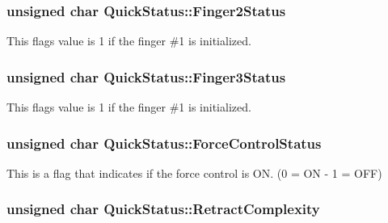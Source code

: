 \subsubsection[{\texorpdfstring{Finger2\+Status}{Finger2Status}}]{\setlength{\rightskip}{0pt plus 5cm}unsigned char Quick\+Status\+::\+Finger2\+Status}\hypertarget{struct_quick_status_a00d03a339f99ef4565b55f157b7d0ebc}{}\label{struct_quick_status_a00d03a339f99ef4565b55f157b7d0ebc}


This flag\textquotesingle{}s value is 1 if the finger \#1 is initialized. 

\subsubsection[{\texorpdfstring{Finger3\+Status}{Finger3Status}}]{\setlength{\rightskip}{0pt plus 5cm}unsigned char Quick\+Status\+::\+Finger3\+Status}\hypertarget{struct_quick_status_adb0674bfd3b4131c3e2ae0862d5bee50}{}\label{struct_quick_status_adb0674bfd3b4131c3e2ae0862d5bee50}


This flag\textquotesingle{}s value is 1 if the finger \#1 is initialized. 

\subsubsection[{\texorpdfstring{Force\+Control\+Status}{ForceControlStatus}}]{\setlength{\rightskip}{0pt plus 5cm}unsigned char Quick\+Status\+::\+Force\+Control\+Status}\hypertarget{struct_quick_status_a68fa24e235f5b81c7231abf1e121be50}{}\label{struct_quick_status_a68fa24e235f5b81c7231abf1e121be50}


This is a flag that indicates if the force control is ON. (0 = ON -\/ 1 = O\+FF) 

\subsubsection[{\texorpdfstring{Retract\+Complexity}{RetractComplexity}}]{\setlength{\rightskip}{0pt plus 5cm}unsigned char Quick\+Status\+::\+Retract\+Complexity}\hypertarget{struct_quick_status_ab905987dc81a754d7966b71e6c6b31a0}{}\label{struct_quick_status_ab905987dc81a754d7966b71e6c6b31a0}


